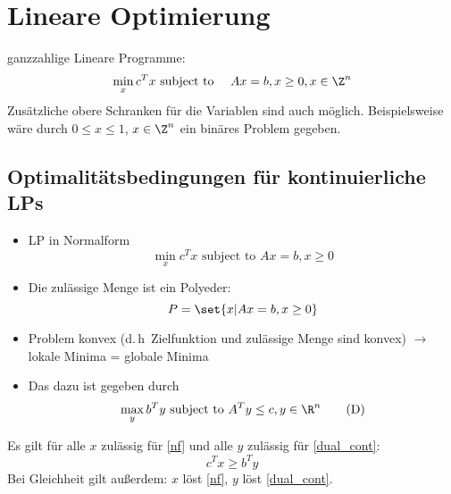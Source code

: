 \section{Lineare Optimierung}
ganzzahlige Lineare Programme:
\begin{equation*}
	\min_{x} c^Tx \text{ subject to } \quad Ax = b, x \geq 0, x \in \Z^n
\end{equation*}
Zusätzliche obere Schranken für die Variablen sind auch möglich.
Beispielsweise wäre durch $0 \leq x \leq 1$, $x \in \Z^n$ ein binäres Problem gegeben.
\subsection{Optimalitätsbedingungen für kontinuierliche LPs}
\begin{itemize}
	\item LP in Normalform
		\begin{equation}\label{nf}
			\min_{x} c^Tx \text{ subject to } Ax = b, x\geq 0\tag{P}
		\end{equation}
	\item Die zulässige Menge ist ein Polyeder:
		\begin{equation*}
			P = \set{ x | Ax = b ,x \geq 0 }
		\end{equation*}
  \item Problem konvex (d.\,h\ Zielfunktion und zulässige Menge sind konvex) $\to$	lokale Minima = globale Minima
  \item Das dazu  ist gegeben durch
		\begin{equation*}\label{dual_cont}
			\max_{y}b^Ty \text{ subject to } A^Ty \leq c, y \in \R^n \tag{D}
		\end{equation*}
\end{itemize}
\begin{lemma} \label{thm:schwache_dualitat}
		Es gilt für alle $x$ zulässig für \eqref{nf} und alle $y$ zulässig für \eqref{dual_cont}:
		\begin{equation*}
			c^Tx \geq b^Ty
		\end{equation*}
		Bei Gleichheit gilt außerdem: $x$ löst \eqref{nf}, $y$ löst \eqref{dual_cont}.
\end{lemma} %
